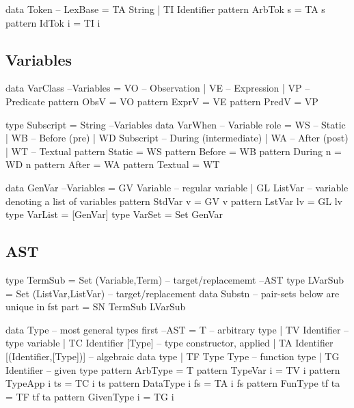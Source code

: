 \newpage
\begin{code}
data Token                                                         -- LexBase
 = TA String
 | TI Identifier
pattern ArbTok s = TA s
pattern IdTok i = TI i
\end{code}

\subsection{Variables}

\begin{code}
data VarClass                                                     --Variables
  = VO -- Observation
  | VE -- Expression
  | VP -- Predicate
pattern ObsV  = VO
pattern ExprV = VE
pattern PredV = VP
\end{code}

\begin{code}
type Subscript = String                                           --Variables
data VarWhen -- Variable role
  = WS            --  Static
  | WB            --  Before (pre)
  | WD Subscript  --  During (intermediate)
  | WA            --  After (post)
  | WT            --  Textual
pattern Static    =  WS
pattern Before    =  WB
pattern During n  =  WD n
pattern After     =  WA
pattern Textual   =  WT
\end{code}

\begin{code}
data GenVar                                                        --Variables
 = GV Variable -- regular variable
 | GL ListVar  -- variable denoting a list of variables
pattern StdVar v = GV v
pattern LstVar lv = GL lv
type VarList = [GenVar]
type VarSet = Set GenVar
\end{code}


\subsection{AST}

\begin{code}
type TermSub = Set (Variable,Term) -- target/replacememt                --AST
type LVarSub = Set (ListVar,ListVar) -- target/replacement
data Substn --  pair-sets below are unique in fst part
  = SN TermSub LVarSub
\end{code}

\begin{code}
data Type -- most general types first                                   --AST
 = T  -- arbitrary type
 | TV Identifier -- type variable
 | TC Identifier [Type] -- type constructor, applied
 | TA Identifier [(Identifier,[Type])] -- algebraic data type
 | TF Type Type -- function type
 | TG Identifier -- given type
pattern ArbType = T
pattern TypeVar i  = TV i
pattern TypeApp i ts = TC i ts
pattern DataType i fs = TA i fs
pattern FunType tf ta = TF tf ta
pattern GivenType i = TG i
\end{code}


